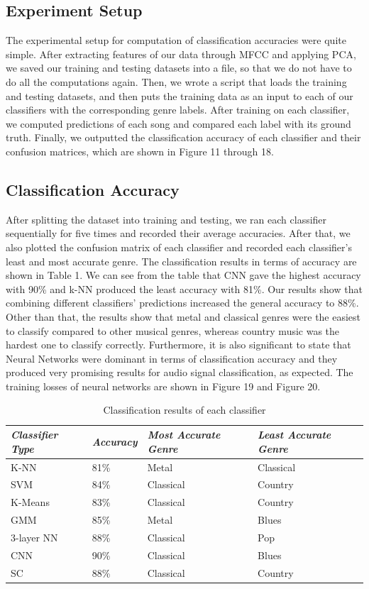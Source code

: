 \subsection{Experiment Setup}
The experimental setup for computation of classification accuracies were quite simple. After extracting features of our data through MFCC and applying PCA, we saved our training and testing datasets into a file, so that we do not have to do all the computations again. Then, we wrote a script that loads the training and testing datasets, and then puts the training data as an input to each of our classifiers with the corresponding genre labels. After training on each classifier, we computed predictions of each song and compared each label with its ground truth. Finally, we outputted the classification accuracy of each classifier and their confusion matrices, which are shown in Figure 11 through 18.

\subsection{Classification Accuracy}
After splitting the dataset into training and testing, we ran each classifier sequentially for five times and recorded their average accuracies. After that, we also plotted the confusion matrix of each classifier and recorded each classifier's least and most accurate genre. The classification results in terms of accuracy are shown in Table 1. We can see from the table that CNN gave the highest accuracy with 90\% and k-NN produced the least accuracy with 81\%. Our results show that combining different classifiers' predictions increased the general accuracy to 88\%. Other than that, the results show that metal and classical genres were the easiest to classify compared to other musical genres, whereas country music was the hardest one to classify correctly. Furthermore, it is also significant to state that Neural Networks were dominant in terms of classification accuracy and they produced very promising results for audio signal classification, as expected. The training losses of neural networks are shown in Figure 19 and Figure 20. 
\begin{table}
\begin{center}
\caption{Classification results of each classifier} 
\begin{tabular}{ p{1.9cm} p{1.1cm} p{2.8cm} p{2.8cm}}
 \emph{Classifier Type} & \emph{Accuracy}  & \emph{Most Accurate Genre} & \emph{Least Accurate Genre}\\
 \hline
 K-NN & 81\% & Metal & Classical \\
 SVM & 84\% & Classical & Country \\
 K-Means & 83\% & Classical & Country \\
 GMM & 85\% & Metal & Blues \\
 3-layer NN & 88\% & Classical & Pop \\
 CNN & 90\% & Classical & Blues \\
 SC & 88\% & Classical  & Country  \\
\end{tabular}
\end{center}
\end{table}

